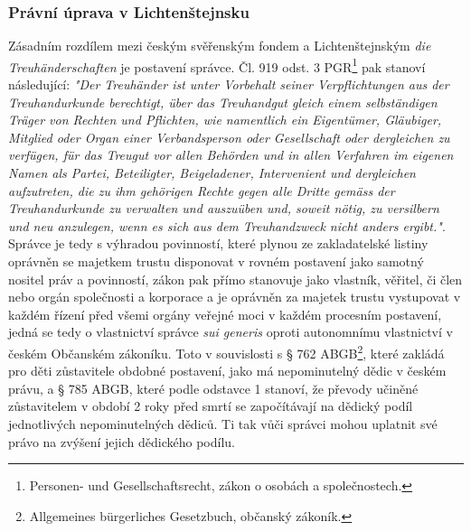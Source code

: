 \documentclass{article}
\begin{document}


\subsubsection{Právní úprava v Lichtenštejnsku}

Zásadním rozdílem mezi českým svěřenským fondem a Lichtenštejnským \textit{die Treuhänderschaften} je postavení správce. Čl. 919 odst. 3 PGR\footnote{Personen- und Gesellschaftsrecht, zákon o osobách a společnostech.} pak stanoví následující: \textit{"Der Treuhänder ist unter Vorbehalt seiner Verpflichtungen aus der Treuhandurkunde berechtigt, über das Treuhandgut gleich einem selbständigen Träger von Rechten und Pflichten, wie namentlich ein Eigentümer, Gläubiger, Mitglied oder Organ einer Verbandsperson oder Gesellschaft oder dergleichen zu verfügen, für das Treugut vor allen Behörden und in allen Verfahren im eigenen Namen als Partei, Beteiligter, Beigeladener, Intervenient und dergleichen aufzutreten, die zu ihm gehörigen Rechte gegen alle Dritte gemäss der Treuhandurkunde zu verwalten und auszuüben und, soweit nötig, zu versilbern und neu anzulegen, wenn es sich aus dem Treuhandzweck nicht anders ergibt."}.\\

Správce je tedy s výhradou povinností, které plynou ze zakladatelské listiny oprávněn se majetkem trustu disponovat v rovném postavení jako samotný nositel práv a povinností, zákon pak přímo stanovuje jako vlastník, věřitel, či člen nebo orgán společnosti a korporace a je oprávněn za majetek trustu vystupovat v každém řízení před všemi orgány veřejné moci v každém procesním postavení, jedná se tedy o vlastnictví správce \textit{sui generis} oproti autonomnímu vlastnictví v českém Občanském zákoníku. Toto v souvislosti s § 762 ABGB\footnote{Allgemeines bürgerliches Gesetzbuch, občanský zákoník.}, které zakládá pro děti zůstavitele obdobné postavení, jako má nepominutelný dědic v českém právu, a § 785 ABGB, které podle odstavce 1 stanoví, že převody učiněné zůstavitelem v období 2 roky před smrtí se započítávají na dědický podíl jednotlivých nepominutelných dědiců. Ti tak vůči správci mohou uplatnit své právo na zvýšení jejich dědického podílu.\\
\end{document}
